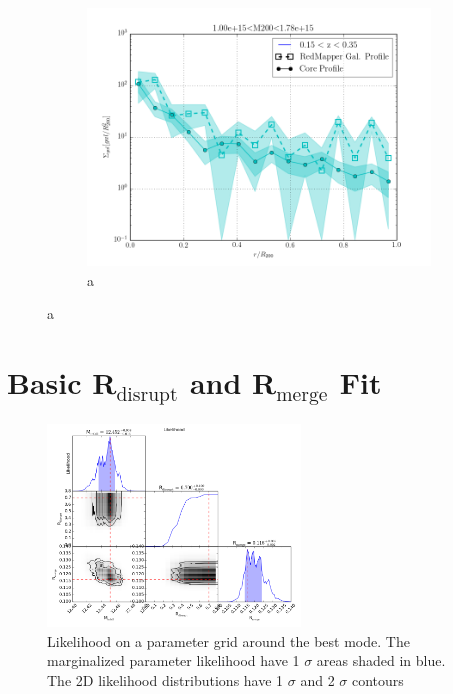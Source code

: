 \documentclass[twocolumn]{article}
\begin{document}
\begin{figure}
\begin{subfigure}{.5\textwidth}
    \centering\includegraphics[width=1.0\linewidth]{figs/cfn/basic_rm.param/plot_zmrs.py/fig6.png}
    \caption{a}
  \end{subfigure}
  
\end{figure}
\clearpage

\section{Basic R$_{\mathrm{disrupt}}$ and R$_{\mathrm{merge}}$ Fit}

\begin{figure}[H]
  \center\includegraphics[width=0.6\textwidth]{figs/cfn/basic_rd_rm.param/calc_likelihood_bounds.py/fig1.png}
  \caption{Likelihood on a parameter grid around the best mode. The marginalized parameter likelihood have
    1 $\sigma$ areas shaded in blue. The 2D likelihood distributions have 1 $\sigma$  and 2 $\sigma$ contours}
  \label{fig:basic_rd_rm:likelihood}
\end{figure}
\end{document}
